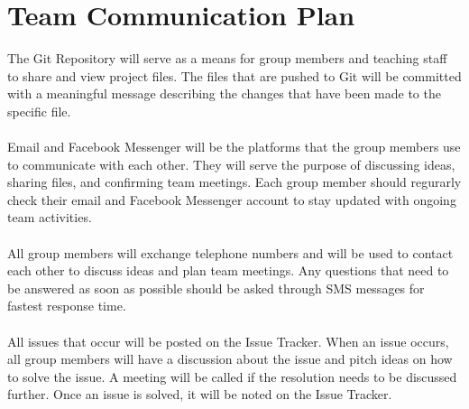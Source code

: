 \documentclass{article}
\begin{document}
\section{Team Communication Plan}
The Git Repository will serve as a means for group members and teaching staff to share and view project files. The files that are pushed to Git will be committed with a meaningful message describing the changes that have been made to the specific file. \\
\\
Email and Facebook Messenger will be the platforms that the group members use to communicate with each other. They will serve the purpose of discussing ideas, sharing files, and confirming team meetings. Each group member should regurarly check their email and Facebook Messenger account to stay updated with ongoing team activities.\\
\\
All group members will exchange telephone numbers and will be used to contact each other to discuss ideas and plan team meetings. Any questions that need to be answered as soon as possible should be asked through SMS messages for fastest response time. \\
\\
All issues that occur will be posted on the Issue Tracker. When an issue occurs, all group members will have a discussion about the issue and pitch ideas on how to solve the issue. A meeting will be called if the resolution needs to be discussed further. Once an issue is solved, it will be noted on the Issue Tracker.
\end{document}
